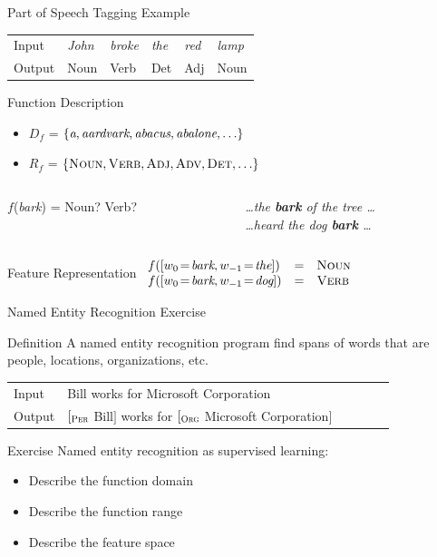 \documentclass[12pt]{beamer}
\newcommand{\key}[1]{{\color{blue}#1}}
\newcommand{\SC}[1]{\mbox{\sc#1}}
\newcommand{\EM}[1]{\mbox{\em#1}}
\begin{document}
\begin{frame}{Part of Speech Tagging Example}
	\begin{tabular}{llllll}
		\key{Input}  & \em John & \em broke & \em the & \em red & \em lamp \\
		\pause
		\key{Output} & \sc Noun & \sc Verb  & \sc Det & \sc Adj & \sc Noun \\
	\end{tabular}
	\pause
	\begin{block}{Function Description}
		\begin{itemize}
			\pause
			\item $D_f$ = \pause $\{\EM{a},\EM{aardvark},\EM{abacus},\EM{abalone},\ldots\}$
			\pause
			\item $R_f$ = \pause $\{\SC{Noun},\SC{Verb},\SC{Adj},\SC{Adv},\SC{Det},\ldots\}$
		\end{itemize}
	\end{block}
	\medskip
	\pause
	\begin{columns}
		\begin{column}{2in}
			$f$(\EM{bark}) = \SC{Noun}? \SC{Verb}?
		\end{column}
		\begin{column}{2in}
			\emph{\ldots the \textbf{bark} of the tree \ldots} \\
			\emph{\ldots heard the dog \textbf{bark} \ldots} \\
		\end{column}
	\end{columns}
	\pause
	\begin{block}{Feature Representation}
		$
		\begin{array}{lll}
		f([w_{0}\!=\!\EM{bark}, w_{-1}\!=\!\EM{the}]) & = & \SC{Noun} \\
		f([w_{0}\!=\!\EM{bark}, w_{-1}\!=\!\EM{dog}]) & = & \SC{Verb}
		\end{array}
		$
	\end{block}
\end{frame}
\begin{frame}{Named Entity Recognition Exercise}
	\begin{block}{Definition}
		A \alert{named entity recognition} program find spans of words that are people, locations, organizations, etc.
		
		\medskip
		\begin{tabular}{llllll}
			\key{Input}  & Bill works for Microsoft Corporation\\
			\key{Output} & $[_{\SC{\scriptsize Per}}$ Bill$]$ works for
			               $[_{\SC{\scriptsize Org}}$ Microsoft Corporation$]$ \\
		\end{tabular}
	\end{block}
	\pause
	\begin{block}{Exercise}
		Named entity recognition as supervised learning:
		\begin{itemize}
			\item Describe the function domain
			\item Describe the function range
			\item Describe the feature space
		\end{itemize}
	\end{block}
\end{frame}
\end{document}
